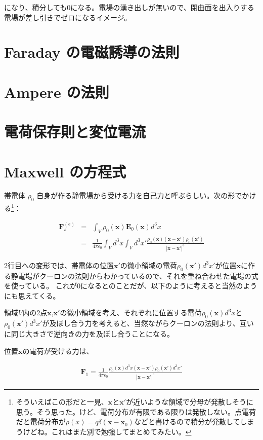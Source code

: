 \documentclass[a4j,12pt,uplatex,dvipdfmx]{jsreport}
\begin{document}
になり、積分しても$0$になる。電場の湧き出しが無いので、閉曲面を出入りする電場が差し引きでゼロになるイメージ。
\section{Faraday の電磁誘導の法則}

\section{Ampere の法則}

\section{電荷保存則と変位電流}

\section{Maxwell の方程式}

帯電体 $\rho_0$ 自身が作る静電場から受ける力を自己力と呼ぶらしい。次の形でかける\footnote{そういえばこの形だと一見、$\bm{x}$と$\bm{x'}$が近いような領域で分母が発散しそうに思う。そう思った。けど、電荷分布が有限である限りは発散しない。点電荷だと電荷分布が$\rho (x) = q \delta(\bm{x} - \bm{x}_0)$などと書けるので積分が発散してしまうけどね。これはまた別で勉強してまとめてみたい。}：

\begin{eqnarray*}
    \bm{F}^{(e)}_{s} &=& \int_{V} \rho_0(\bm{x}) \bm{E}_0(\bm{x}) d^3 x \\
    &=& \frac{1}{4 \pi \epsilon_0} \int_V d^3 x \int_V d^3 x' \frac{\rho_0(\bm{x}) (\bm{x} - \bm{x'}) \rho_0(\bm{x'})}{| \bm{x} - \bm{x'} |^3}
\end{eqnarray*}

2行目への変形では、帯電体の位置$\bm{x'}$の微小領域の電荷$\rho_0(\bm{x'}) d^3 x'$が位置$\bm{x}$に作る静電場がクーロンの法則からわかっているので、それを重ね合わせた電場の式を使っている。
これが$0$になるとのことだが、以下のように考えると当然のようにも思えてくる。

領域$V$内の2点$\bm{x}$,$\bm{x'}$の微小領域を考え、それぞれに位置する電荷$\rho_0(\bm{x})d^3x$と$\rho_0(\bm{x'})d^3x'$が及ぼし合う力を考えると、当然ながらクーロンの法則より、互いに同じ大きさで逆向きの力を及ぼし合うことになる。

位置$\bm{x}$の電荷が受ける力は、

\begin{eqnarray*}
    \bm{F}_1 = \frac{1}{4 \pi \epsilon_0}  \frac{\rho_0(\bm{x})d^3 x (\bm{x} - \bm{x'}) \rho_0(\bm{x'}) d^3 x'}{| \bm{x} - \bm{x'} |^3}
\end{eqnarray*}
\end{document}
